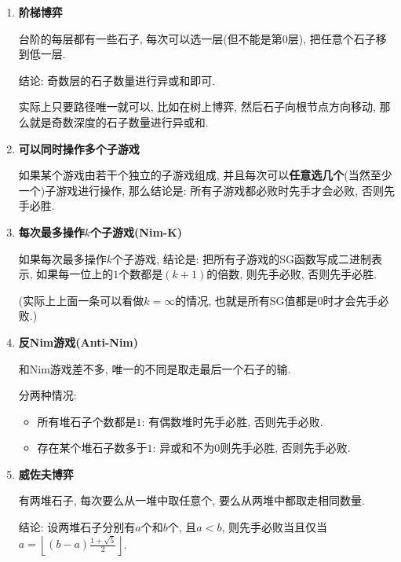 \begin{enumerate}

\item \textbf{阶梯博弈}

台阶的每层都有一些石子, 每次可以选一层(但不能是第$0$层), 把任意个石子移到低一层.

结论: 奇数层的石子数量进行异或和即可.

实际上只要路径唯一就可以, 比如在树上博弈, 然后石子向根节点方向移动, 那么就是奇数深度的石子数量进行异或和.

\item \textbf{可以同时操作多个子游戏}

如果某个游戏由若干个独立的子游戏组成, 并且每次可以\textbf{任意选几个}(当然至少一个)子游戏进行操作, 那么结论是: 所有子游戏都必败时先手才会必败, 否则先手必胜.

\item \textbf{每次最多操作$k$个子游戏(Nim-K)}

如果每次最多操作$k$个子游戏, 结论是: 把所有子游戏的SG函数写成二进制表示, 如果每一位上的$1$个数都是$(k+1)$的倍数, 则先手必败, 否则先手必胜.

(实际上上面一条可以看做$k=\infty$的情况, 也就是所有SG值都是$0$时才会先手必败.)

\item \textbf{反Nim游戏(Anti-Nim)}

和Nim游戏差不多, 唯一的不同是取走最后一个石子的输.

分两种情况:

\begin{itemize}
	\item 所有堆石子个数都是$1$: 有偶数堆时先手必胜, 否则先手必败.
	\item 存在某个堆石子数多于$1$: 异或和不为$0$则先手必胜, 否则先手必败.
\end{itemize}

\item \textbf{威佐夫博弈}

有两堆石子, 每次要么从一堆中取任意个, 要么从两堆中都取走相同数量.

结论: 设两堆石子分别有$a$个和$b$个, 且$a<b$, 则先手必败当且仅当$a = \left\lfloor (b-a)\frac {1 + \sqrt 5} 2 \right\rfloor$.

\end{enumerate}